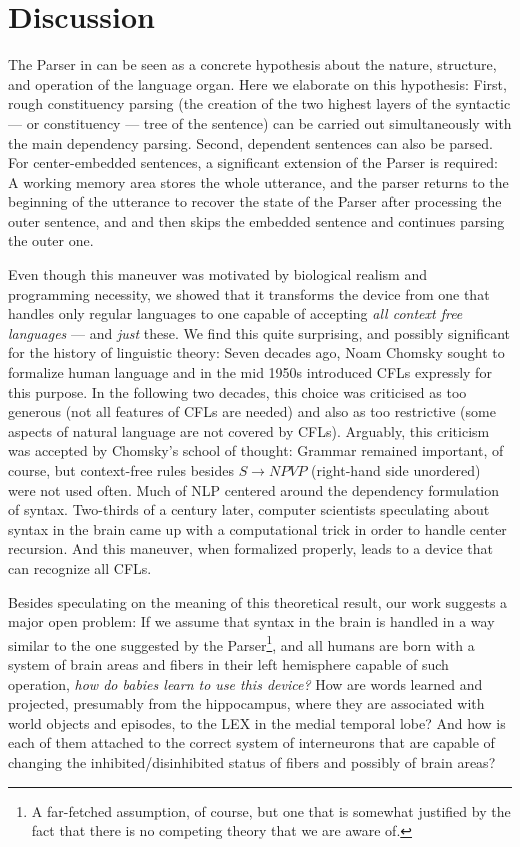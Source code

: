 \documentclass[11pt]{article}
\begin{document}
\section{Discussion} 
The Parser in \citet{Parser} can be seen as a concrete hypothesis about the nature, structure, and operation of the language organ.  Here we elaborate on this hypothesis: First, rough constituency parsing (the creation of the two highest layers of the syntactic --- or constituency --- tree of the sentence) can be carried out simultaneously with the main dependency parsing.  Second, dependent sentences can also be parsed.  For center-embedded sentences, a significant extension of the Parser is required:  A working memory area stores the whole utterance, and the parser returns to the beginning of the utterance to recover the state of the Parser after processing the outer sentence, and and then skips the embedded sentence and continues parsing the outer one.  

Even though this maneuver was motivated by biological realism and programming necessity, we showed that it transforms the device from one that handles only regular languages to one capable of accepting {\em all context free languages} --- and {\em just} these. We find this quite surprising, and possibly significant for the history of linguistic theory: Seven decades ago, Noam Chomsky sought to formalize human language and in the mid 1950s introduced CFLs expressly for this purpose.  In the following two decades, this choice was criticised as too generous (not all features of CFLs are needed) and also as too restrictive (some aspects of natural language are not covered by CFLs). Arguably, this criticism was accepted by Chomsky's school of thought: Grammar remained important, of course, but context-free rules besides $S\rightarrow NP VP$ (right-hand side unordered) were not used often. Much of NLP centered around the dependency formulation of syntax.   Two-thirds of a century later, computer scientists speculating about syntax in the brain came up with a computational trick in order to handle center recursion.  And this maneuver, when formalized properly, leads to a device that can recognize all CFLs.  

Besides speculating on the meaning of this theoretical result, our work suggests a major open problem: If we assume that syntax in the brain is handled in a way similar to the one suggested by the Parser\footnote{A far-fetched assumption, of course, but one that is somewhat justified by the fact that there is no competing theory that we are aware of.}, and all humans are born with a system of brain areas and fibers in their left hemisphere capable of such operation, {\em how do babies learn to use this device?} How are words learned and projected, presumably from the hippocampus, where they are associated with world objects and episodes, to the LEX in the medial temporal lobe?  And how is each of them attached to the correct system of interneurons that are capable of changing the inhibited/disinhibited status of fibers and possibly of brain areas?    
\end{document}
